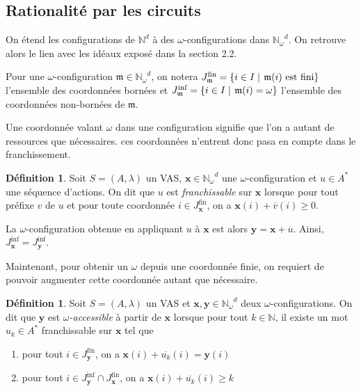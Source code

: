 \documentclass[a4paper,final]{article}
\theoremstyle{definition}
\newtheorem{Definition}[Theorem]{Définition}
\let\geq\geqslant
\newcommand{\set}[2]{\left\{#1\mathrel{\left|\vphantom{#1}\vphantom{#2}\right.}#2\right\}}
\newcommand{\os}[1]{\left\{\mathinner{#1}\right\}}
\let\inter\cap
\newcommand{\N}{\ensuremath{\mathbb{N}}}
\newcommand{\Nomega}{\ensuremath{\mathbb{N}_\omega}}
\newcommand{\lang}{\ensuremath{\mathcal{L}}}
\newcommand{\vect}[1]{\ensuremath{\mathbf{#1}}}
\newcommand{\valeur}[1]{\ensuremath{\overline{#1}}}
\newcommand{\Jfin}[1]{J^\text{fin}_#1}
\newcommand{\Jinf}[1]{J^\text{inf}_#1}
\begin{document}
\subsection{Rationalité par les circuits}



On étend les configurations de $\N^d$ à des $\omega$-configurations dans $\Nomega^d$.
On retrouve alors le lien avec les idéaux exposé dans la section 2.2.

Pour une $\omega$-configuration $\mathfrak{m} \in \Nomega^d$, on notera $\Jfin{\mathfrak{m}} = \set{i\in I}{\mathfrak{m}(i) \text{ est fini}}$ l'ensemble des coordonnées bornées et  $\Jinf{\mathfrak{m}} = \set{i\in I}{\mathfrak{m}(i)=\omega}$ l'ensemble des coordonnées non-bornées de $\mathfrak{m}$.

Une coordonnée valant $\omega$ dans une configuration signifie que l'on a autant de ressources que nécessaires.
ces coordonnées n'entrent donc pasa en compte dans le franchissement.

\begin{Definition}
Soit $S = (A,\lambda)$ un VAS, $\vect{x} \in \Nomega^d$ une $\omega$-configuration et $u \in A^*$ une séquence d'actions.
On dit que $u$ est \emph{franchissable} sur $\vect{x}$ lorsque pour tout préfixe $v$ de $u$ et pour toute coordonnée $i \in \Jfin{\vect{x}}$, on a $\vect{x}(i) + \valeur{v}(i) \geq 0$.

La $\omega$-configuration obtenue en appliquant $u$ à $\vect{x}$ est alors $\vect{y} = \vect{x} + \valeur{u}$.
Ainsi, $\Jinf{\vect{x}} = \Jinf{\vect{y}}$.
\end{Definition}

Maintenant, pour obtenir un $\omega$ depuis une coordonnée finie, on requiert de pouvoir augmenter cette coordonnée autant que nécessaire. 

\begin{Definition}
Soit $S = (A,\lambda)$ un VAS et $\vect{x},\vect{y} \in \Nomega^d$ deux $\omega$-configurations.
On dit que $\vect{y}$ est \emph{$\omega$-accessible} à partir de $\vect{x}$ lorsque pour tout $k\in\N$, il existe un mot $u_k \in A^*$ franchissable sur $\vect{x}$ tel que 
\begin{enumerate}
    \item pour tout $i\in\Jfin{\vect{y}}$, on a $\vect{x}(i) + \valeur{u_k}(i) = \vect{y}(i)$
    \item pour tout $i\in \Jinf{\vect{y}} \inter \Jfin{\vect{x}}$, on a $\vect{x}(i) + \valeur{u_k}(i) \geq k$
\end{enumerate}
\end{Definition}
\end{document}
